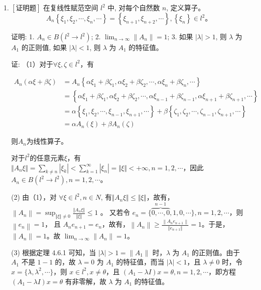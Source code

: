 \documentclass{article}
\begin{document}
\begin{enumerate}
    \item $\left[\textbf{证明题}\right]$ 在复线性赋范空间 $l^2$ 中, 对每个自然数 $n$, 定义算子。
    $$
    A_n\left\{\xi_1, \xi_2, \cdots, \xi_n, \cdots\right\}=\left\{\xi_{n+1}, \xi_{n+2}, \cdots\right\},\left\{\xi_n\right\} \in l^2 。
    $$
    
    证明: 1. $A_n \in B\left(l^2 \rightarrow l^2\right)$; 2. $\lim _{n \rightarrow \infty}\left\|A_{n}\right\|=1$; 3. 如果 $|\lambda|>1$, 则 $\lambda$ 为 $A_1$ 的正则值, 如果 $|\lambda|<1$, 则 $\lambda$ 为 $A_1$ 的特征值。

    证: （1）对于$\forall \xi, \zeta \in l^2$，有

\begin{equation*}
    \begin{aligned}
        A_n(\alpha \xi + \beta \zeta) &= A_n\left\{\alpha \xi_1 + \beta \zeta_1, \alpha \xi_2 + \beta \zeta_2, \cdots, \alpha \xi_{n} + \beta \zeta_{n}, \cdots\right\}\\
        &= \left\{\alpha \xi_1 + \beta \zeta_1, \alpha \xi_2 + \beta \zeta_2, \cdots, \alpha \xi_{n-1} + \beta \zeta_{n-1}, \alpha \xi_{n+1} + \beta \zeta_{n+1}, \cdots\right\}\\
        &=\alpha\left\{\xi_1, \xi_2, \cdots, \xi_{n-1}, \xi_{n+1}, \cdots\right\} + \beta\left\{\zeta_1, \zeta_2, \cdots, \zeta_{n-1}, \zeta_{n+1}, \cdots\right\}\\
        &=\alpha A_n(\xi) + \beta A_n(\zeta)
    \end{aligned}
\end{equation*}

则$A_n$为线性算子。

对于$l^{2}$的任意元素$\xi$，有$\Vert A_n\xi \Vert = \sum_{k\neq n}\left| \xi_k \right| < \sum_{k=1}^{\infty}\left| \xi_n \right| = \Vert \xi \Vert < + \infty, n = 1, 2, \cdots$，因此$A_n \in B\left(l^2 \rightarrow l^2\right), n = 1, 2, \cdots$。

(2) 由（1），对 $\forall \xi \in l^{2}, n \in N$, 有$\Vert A_n\xi \Vert \leq \Vert \xi \Vert$，故有，$\left\|A_n\right\| = \sup_{\Vert \xi \Vert \neq 0} \frac{\Vert A_n \xi \Vert}{\Vert \xi \Vert} \leq 1$ 。 又若令 $e_n=\{\overbrace{0, \cdots, 0}^{n-1}, 1,0, \cdots\}, n=1,2, \cdots$，则 $\left\|e_n\right\|=1$， 且 $A_n e_{n+1}=e_n$，故有，$\left\|A_n\right\| \geq \frac{\left\|A_n e_{n+1}\right\|}{\Vert e_{n+1} \Vert}=1$。于是，$\left\|A_n\right\|=1$。故 $\lim _{n \rightarrow \infty}\left\|A_n\right\|=1$。

(3) 根据定理 4.6.1 可知，当 $|\lambda|>1=\left\|A_1\right\|$ 时，$\lambda$ 为 $A_1$ 的正则值。由于 $A_1$ 不是 $1-1$ 的，故 $\lambda=0$ 为 $A_1$ 的特征值，而当 $|\lambda|<1$，且 $\lambda \neq 0$ 时，令 $x=\{ \lambda, \lambda^2, \cdots\}$，则 $x \in l^{2}, x \neq \theta$，且 $\left(A_1-\lambda I\right) x=\theta, n=1,2, \cdots$，即方程 $\left(A_1-\lambda I\right) x=\theta$ 有非零解，故 $\lambda$ 为 $A_1$ 的特征值。

\end{enumerate}
\end{document}
